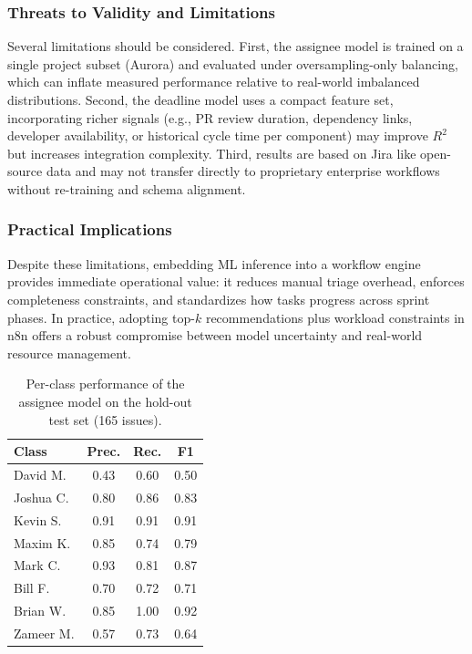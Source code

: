 \documentclass[conference]{IEEEtran}
\begin{document}
\subsubsection{Threats to Validity and Limitations}
Several limitations should be considered. First, the assignee model is trained on a single project subset (Aurora) and evaluated under oversampling-only balancing, which can inflate measured performance relative to real-world imbalanced distributions. Second, the deadline model uses a compact feature set, incorporating richer signals (e.g., PR review duration, dependency links, developer availability, or historical cycle time per component) may improve $R^2$ but increases integration complexity. Third, results are based on Jira like open-source data and may not transfer directly to proprietary enterprise workflows without re-training and schema alignment.

\subsubsection{Practical Implications}
Despite these limitations, embedding ML inference into a workflow engine provides immediate operational value: it reduces manual triage overhead, enforces completeness constraints, and standardizes how tasks progress across sprint phases. In practice, adopting top-$k$ recommendations plus workload constraints in n8n offers a robust compromise between model uncertainty and real-world resource management.

\begin{table}[t]
\centering
\caption{Per-class performance of the assignee model on the hold-out test set (165 issues).}
\renewcommand{\arraystretch}{1.05}
\begin{tabular}{l c c c}
\hline
\textbf{Class} & \textbf{Prec.} & \textbf{Rec.} & \textbf{F1} \\
\hline
David M.  & 0.43 & 0.60 & 0.50 \\
Joshua C. & 0.80 & 0.86 & 0.83 \\
Kevin S.  & 0.91 & 0.91 & 0.91 \\
Maxim K.  & 0.85 & 0.74 & 0.79 \\
Mark C.   & 0.93 & 0.81 & 0.87 \\
Bill F.   & 0.70 & 0.72 & 0.71 \\
Brian W.  & 0.85 & 1.00 & 0.92 \\
Zameer M. & 0.57 & 0.73 & 0.64 \\
\hline
\end{tabular}
\label{tab:assignee_perclass}
\end{table}
\end{document}
